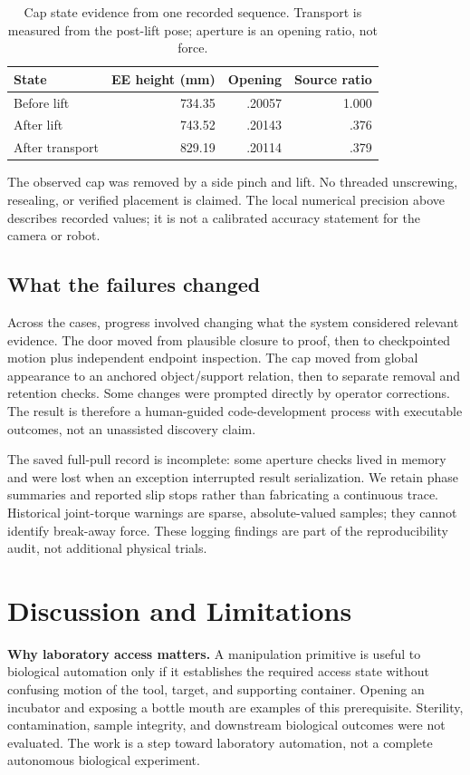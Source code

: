 \begin{table}[t]\centering\small
\caption{Cap state evidence from one recorded sequence. Transport is measured
from the post-lift pose; aperture is an opening ratio, not force.}
\label{tab:cap}
\begin{tabular}{lrrr}\toprule
State & EE height (mm) & Opening & Source ratio\\\midrule
Before lift & 734.35 & .20057 & 1.000\\
After lift & 743.52 & .20143 & .376\\
After transport & 829.19 & .20114 & .379\\\bottomrule
\end{tabular}
\end{table}

The observed cap was removed by a side pinch and lift. No threaded unscrewing,
resealing, or verified placement is claimed. The local numerical precision
above describes recorded values; it is not a calibrated accuracy statement
for the camera or robot.

\subsection{What the failures changed}
Across the cases, progress involved changing what the system considered
relevant evidence. The door moved from plausible closure to proof, then to
checkpointed motion plus independent endpoint inspection. The cap moved from
global appearance to an anchored object/support relation, then to separate
removal and retention checks. Some changes were prompted directly by operator
corrections. The result is therefore a human-guided code-development process
with executable outcomes, not an unassisted discovery claim.

The saved full-pull record is incomplete: some aperture checks lived in memory
and were lost when an exception interrupted result serialization. We retain
phase summaries and reported slip stops rather than fabricating a continuous
trace. Historical joint-torque warnings are sparse, absolute-valued samples;
they cannot identify break-away force. These logging findings are part of the
reproducibility audit, not additional physical trials.

\section{Discussion and Limitations}
\textbf{Why laboratory access matters.} A manipulation primitive is useful to
biological automation only if it establishes the required access state without
confusing motion of the tool, target, and supporting container. Opening an
incubator and exposing a bottle mouth are examples of this prerequisite.
Sterility, contamination, sample integrity, and downstream biological outcomes
were not evaluated. The work is a step toward laboratory automation, not a
complete autonomous biological experiment.


